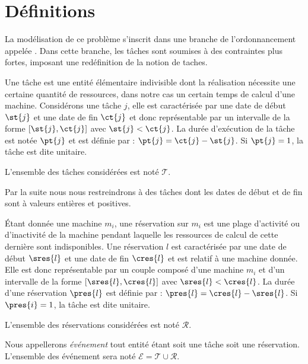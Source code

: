 \documentclass[a4paper,9pt]{report}
\begin{document}
\section{Définitions}
\label{intro_def}

La modélisation de ce problème s'inscrit dans une branche de l'ordonnancement appelée \isched. Dans
cette branche, les tâches sont soumises à des contraintes plus fortes, imposant une redéfinition de
la notion de taches.

\begin{ndf}[Tâche]
    Une tâche est une entité élémentaire indivisible dont la réalisation nécessite une certaine
    quantité de ressources, dans notre cas un certain temps de calcul d'une machine. Considérons une
    tâche $j$, elle est caractérisée par une date de début $\st{j}$ et une date de fin $\ct{j}$ et donc
    représentable par un intervalle de la forme $[\st{j}, \ct{j}]$ avec $\st{j} < \ct{j}$. La durée d'exécution
    de la tâche est notée $\pt{j}$ et est définie par : $\pt{j} = \ct{j} - \st{j}$. Si $\pt{j} = 1$,
    la tâche est dite unitaire.

    L'ensemble des tâches considérées est noté $\mathcal{T}$.
\end{ndf}

\begin{nrmq}
    Par la suite nous nous restreindrons à des tâches dont les dates de début et de fin sont à
    valeurs entières et positives.
\end{nrmq}

\begin{ndf}[Réservation]
    Étant donnée une machine $m_i$, une réservation sur $m_i$ est une plage d'activité ou
    d'inactivité de la machine pendant laquelle les ressources de calcul de cette dernière sont
    indisponibles. Une réservation $l$ est caractérisée par une date de début $\sres{l}$ et une date de fin
    $\cres{l}$ et est relatif à une machine donnée. Elle est donc représentable par un couple composé
    d'une machine $m_i$ et d'un intervalle de la forme $[\sres{l}, \cres{l}]$ avec $\sres{l} < \cres{l}$.
    La durée d'une réservation $\pres{l}$ est définie par :  $\pres{l} = \cres{l} - \sres{l}$. Si
    $\pres{i} = 1$, la tâche est dite unitaire.

    L'ensemble des réservations considérées est noté $\mathcal{R}$.
\end{ndf}

\begin{ndef}
    Nous appellerons \emph{événement} tout entité étant soit une tâche soit une réservation.
    L'ensemble des événement sera noté $\mathcal{E} = \mathcal{T} \cup \mathcal{R}$.
\end{ndef}
\end{document}
